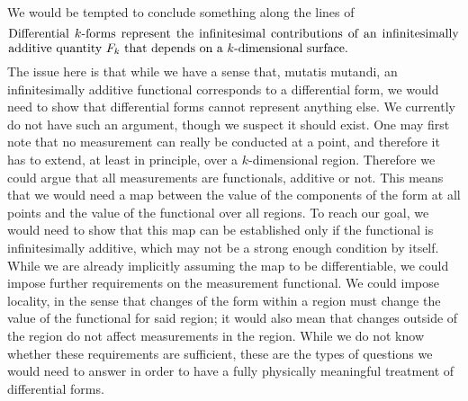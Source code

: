 We would be tempted to conclude something along the lines of
\begin{equation}
	\parbox{5in}{Differential $k$-forms represent the infinitesimal contributions of an infinitesimally additive quantity $F_k$ that depends on a $k$-dimensional surface.}
\end{equation} 
The issue here is that while we have a sense that, mutatis mutandi, an infinitesimally additive functional corresponds to a differential form, we would need to show that differential forms cannot represent anything else. We currently do not have such an argument, though we suspect it should exist. One may first note that no measurement can really be conducted at a point, and therefore it has to extend, at least in principle, over a $k$-dimensional region. Therefore we could argue that all measurements are functionals, additive or not. This means that we would need a map between the value of the components of the form at all points and the value of the functional over all regions. To reach our goal, we would need to show that this map can be established only if the functional is infinitesimally additive, which may not be a strong enough condition by itself. While we are already implicitly assuming the map to be differentiable, we could impose further requirements on the measurement functional. We could impose locality, in the sense that changes of the form within a region must change the value of the functional for said region; it would also mean that changes outside of the region do not affect measurements in the region. While we do not know whether these requirements are sufficient, these are the types of questions we would need to answer in order to have a fully physically meaningful treatment of differential forms.

